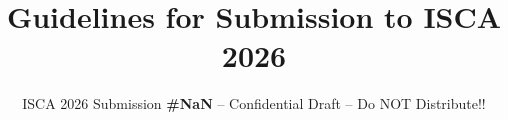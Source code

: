 \documentclass[conference]{IEEEtran}
\begin{document}
\pdfpagewidth=8.5in
\pdfpageheight=11in

\newcommand{\iscasubmissionnumber}{NaN}


\title{Guidelines for Submission to ISCA 2026}
\author{\normalsize{ISCA 2026 Submission
    \textbf{\#\iscasubmissionnumber} -- Confidential Draft -- Do NOT Distribute!!}}


\maketitle
\thispagestyle{plain}
\pagestyle{plain}



\end{document}
